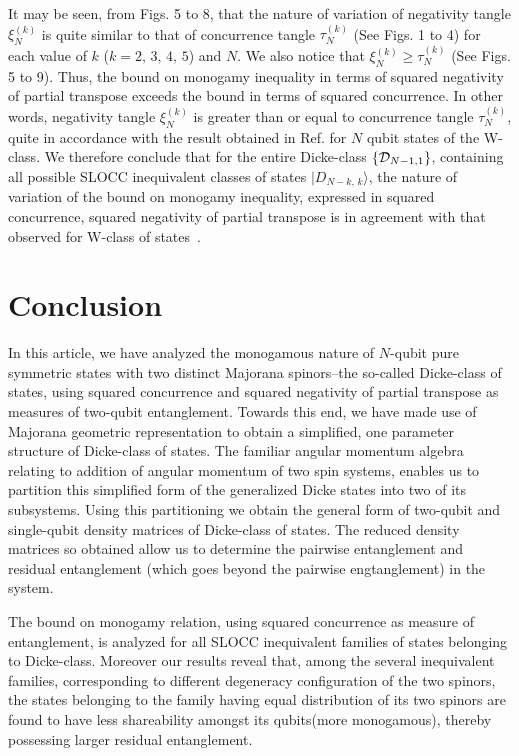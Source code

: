 \documentclass[pra,a4paper,showpacs,superscriptaddress]{revtex4}
\begin{document}
It may be seen, from Figs. 5 to 8, that the nature of variation of negativity tangle $\xi^{(k)}_N$ is quite similar to that of concurrence tangle $\tau^{(k)}_N$ (See Figs. 1 to 4) for each value of $k$ ($k=2,\,3,\,4,\,5$) and $N$. We also notice that
$\xi^{(k)}_N\geq \tau^{(k)}_N$ (See Figs. 5 to 9). Thus, the bound on monogamy inequality in terms of squared negativity of partial transpose exceeds the bound in terms of squared concurrence. In other words, negativity tangle $\xi^{(k)}_N$ is greater than or equal to concurrence tangle $\tau^{(k)}_N$, quite in accordance with the result obtained in Ref.\cite{neg} for $N$ qubit states of the W-class. We therefore conclude that for the entire Dicke-class $\{{\cal D}_{N-1,1}\}$,  containing all possible SLOCC inequivalent classes of states 
$\vert D_{N-k,\,k}\rangle$, the nature of variation of the bound on monogamy inequality, expressed in squared concurrence, squared negativity of partial transpose is in agreement with that observed for W-class of states~\cite{pjg2}. 

\section{Conclusion} 
In this article, we have analyzed the monogamous nature of $N$-qubit pure symmetric states with two distinct Majorana spinors--the so-called 
Dicke-class of states, using squared concurrence and squared negativity of partial transpose as measures of two-qubit entanglement.  
Towards this end, we have made use of Majorana geometric representation to obtain a simplified, one parameter structure of Dicke-class of states. The familiar angular momentum algebra relating to addition of angular momentum of two spin systems, 
enables us to partition this simplified form of the generalized Dicke states into two of its subsystems.
Using this partitioning we obtain the general form of two-qubit and single-qubit density matrices of Dicke-class of states. The reduced density matrices so obtained allow us to determine the pairwise entanglement and residual entanglement (which goes beyond the pairwise engtanglement) in the system. 

The bound on monogamy relation, using squared concurrence as measure of entanglement, is analyzed for all SLOCC inequivalent families of states belonging to Dicke-class. Moreover our results reveal that, among the several inequivalent families, corresponding to different degeneracy configuration of the two spinors, the states belonging to the family having equal distribution of its two spinors are found to have less shareability amongst its qubits(more monogamous), thereby possessing larger residual entanglement. 
\end{document}
